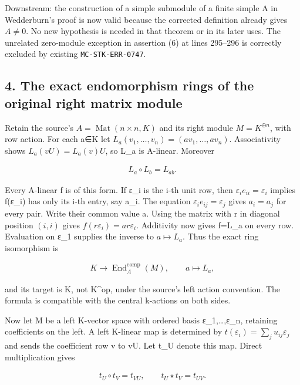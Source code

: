 \documentclass[11pt]{article}
\begin{document}
Downstream: the construction of a simple submodule of a finite simple A in Wedderburn's proof is now valid because the corrected definition already gives \(A\ne 0\). No new hypothesis is needed in that theorem or in its later uses. The unrelated zero-module exception in assertion (6) at lines 295--296 is correctly excluded by existing \texttt{MC-STK-ERR-0747}.

\subsection{4. The exact endomorphism rings of the original right matrix module}\label{the-exact-endomorphism-rings-of-the-original-right-matrix-module}

Retain the source's \(A=\operatorname{Mat}(n\times n,K)\) and its right module \(M=K^{\oplus n}\), with row action. For each a∈K let \(L_{a}(v_{1},\ldots ,v_{n})=(av_{1},\ldots ,av_{n})\). Associativity shows \(L_{a}(vU)=L_{a}(v)U\), so L\_a is A-linear. Moreover

\[\begin{gathered}
L_{a} \circ L_{b} = L_{ab}.
\end{gathered}\]

Every A-linear f is of this form. If ε\_i is the i-th unit row, then \(\varepsilon _{i} e_{ii}=\varepsilon _{i}\) implies f(ε\_i) has only its i-th entry, say a\_i. The equation \(\varepsilon _{i} e_{ij}=\varepsilon _{j}\) gives \(a_{i}=a_{j}\) for every pair. Write their common value a. Using the matrix with r in diagonal position \((i,i)\) gives \(f(r \varepsilon _{i})=ar \varepsilon _{i}\). Additivity now gives f=L\_a on every row. Evaluation on ε\_1 supplies the inverse to \(a\mapsto L_{a}\). Thus the exact ring isomorphism is

\[\begin{gathered}
K \to \operatorname{End}_{A}^{\mathrm{comp}}(M),\qquad a \mapsto L_{a},
\end{gathered}\]

and its target is K, not K\^{}op, under the source's left action convention. The formula is compatible with the central k-actions on both sides.

Now let M be a left K-vector space with ordered basis ε\_1,\ldots,ε\_n, retaining coefficients on the left. A left K-linear map is determined by \(t(\varepsilon _{i})=\sum _{j} u_{ij} \varepsilon _{j}\) and sends the coefficient row v to vU. Let t\_U denote this map. Direct multiplication gives

\[\begin{gathered}
t_{U} \circ t_{V} = t_{VU},\qquad t_{U} \star t_{V} = t_{UV}.
\end{gathered}\]
\end{document}

